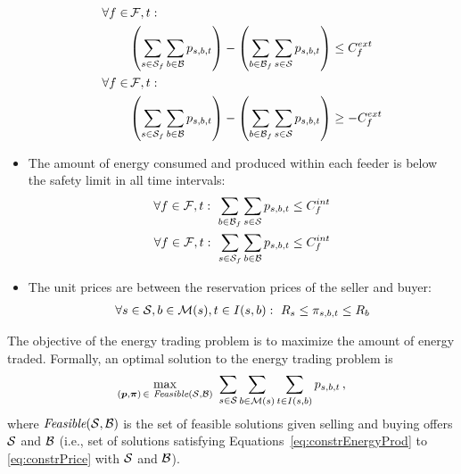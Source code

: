 \begin{itemize}
\begin{align}
\forall f \in & \, \calF, t: \nonumber \\ 
& \left( \sum_{s \in \calS_f} \sum_{b \in \calB} p_{s,b,t} \right) - \left( \sum_{b \in \calB_f} \sum_{s \in \calS} p_{s,b,t} \right) \leq C_f^{ext} \label{eq:constrExtProd} \\
\forall f \in & \, \calF, t: \nonumber \\
& \left( \sum_{s \in \calS_f} \sum_{b \in \calB} p_{s,b,t} \right) - \left( \sum_{b \in \calB_f} \sum_{s \in \calS} p_{s,b,t} \right) \geq -C_f^{ext} \label{eq:constrExtCons} 
\end{align}
\item The amount of energy consumed and produced within each feeder is below the safety limit in all time intervals:
\begin{align}
\forall f \in \calF, t: ~ \sum_{b \in \calB_f} \sum_{s \in \calS} p_{s,b,t} \leq C_f^{int} \label{eq:constrIntCons} \\
\forall f \in \calF, t: ~ \sum_{s \in \calS_f} \sum_{b \in \calB} p_{s,b,t} \leq C_f^{int} \label{eq:constrIntProd} 
\end{align}
\item The unit prices are between the reservation prices of the seller and buyer:
\begin{align}
\forall s \in \calS, b \in \calM(s), t \in I(s,b): ~ R_s \leq \pi_{s,b,t} \leq R_b \label{eq:constrPrice} 
\end{align}
\end{itemize}

The objective of the energy trading problem is to maximize the amount of energy traded.
Formally, an optimal solution to the energy trading problem is
\begin{align}
\max_{(\boldsymbol{p},\boldsymbol{\pi}) \, \in \textit{ Feasible}(\mathcal{S}, \mathcal{B})} ~
\sum_{s \in \mathcal{S}} \sum_{b \in \mathcal{M}(s)} \sum_{t \in I(s,b)} p_{s,b,t} \, , 
\end{align}
where $\textit{Feasible}(\mathcal{S}, \mathcal{B})$ is the set of feasible solutions given selling and buying offers $\mathcal{S}$ and $\mathcal{B}$ (i.e., set of solutions satisfying Equations~\eqref{eq:constrEnergyProd} to \eqref{eq:constrPrice} with $\mathcal{S}$ and $\mathcal{B}$).




